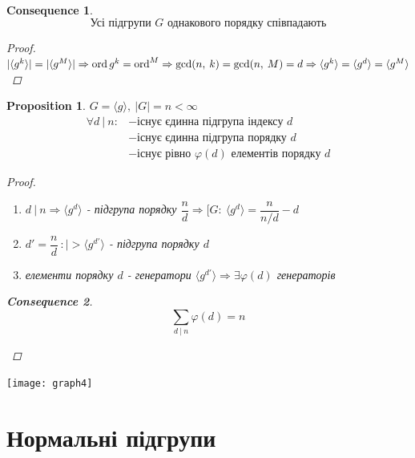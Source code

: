 \documentclass[a4paper,12pt, centered]{bookest}
\newtheorem*{prop*}{Proposition}
\newtheorem*{cons*}{Consequence}
\DeclareMathOperator{\ord}{ord}
\begin{document}
\begin{cons*}
	$$\textrm{Усі підгрупи }G\textrm{ однакового порядку співпадають}$$
	\begin{proof}
		$|\langle g^k\rangle|=|\langle g^M\rangle|\Rightarrow\ord g^k=\ord^M\Rightarrow\gcd(n,\>k)=\gcd(n,\>M)=d\\\Rightarrow\langle g^k\rangle=\langle g^d\rangle=\langle g^M\rangle$
	\end{proof}
\end{cons*}
\begin{prop*}$G=\langle g\rangle,\>|G|=n<\infty$
	\begin{align*}
		\forall d\>|\>n:&-\textrm{існує єдинна підгрупа індексу } d\\
		&-\textrm{існує єдинна підгрупа порядку } d\\
		&-\textrm{існує рівно }\varphi(d) \textrm{ елементів порядку } d
	\end{align*}
	\begin{proof}$ $
		\begin{enumerate}
			\item $d\>|\>n\Rightarrow\langle g^d\rangle$ - підгрупа порядку $\dfrac nd\Rightarrow[G:\>\langle g^d\rangle=\dfrac n{n/d}-d$
			\item $d'=\dfrac nd\>:|>\langle g^{d'}\rangle$ - підгрупа порядку $d$
			\item елементи порядку $d$ - генератори $\langle g^{d'}\rangle\Rightarrow\exists\varphi(d)$ генераторів
		\end{enumerate}
		\begin{cons*}
			$$\sum\limits_{d\>|\>n}\varphi(d)=n$$
		\end{cons*}
	\end{proof}
\end{prop*}
\begin{center}
	\texttt{[image: graph4]}
\end{center}\newpage
\section{Нормальні підгрупи}
\end{document}
